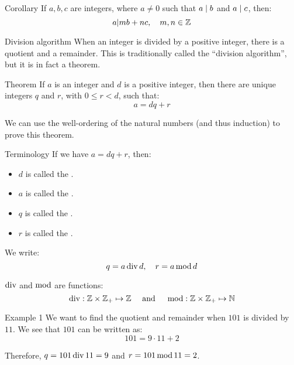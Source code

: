 \documentclass[a4paper]{article}
\begin{document}
\begin{parag}{Corollary}
    If $a,b,c$ are integers, where $a \neq 0$ such that $a \mid b$ and $a \mid c$, then:
    \[a | mb + nc, \quad m,n \in \mathbb{Z}\]
\end{parag}

\begin{parag}{Division algorithm}
    When an integer is divided by a positive integer, there is a quotient and a remainder. This is traditionally called the ``division algorithm'', but it is in fact a theorem.

    \begin{subparag}{Theorem}
        If $a$ is an integer and $d$ is a positive integer, then there are unique integers $q$ and $r$, with $0 \leq r < d$, such that: 
        \[a = dq + r\]

        We can use the well-ordering of the natural numbers (and thus induction) to prove this theorem.
    \end{subparag}

    \begin{subparag}{Terminology}
        If we have $a = dq + r$, then:
        \begin{itemize}
            \item $d$ is called the .
            \item $a$ is called the .
            \item $q$ is called the .
            \item $r$ is called the .
        \end{itemize}

        We write: 
        \[q = a \operatorname{div} d, \quad r = a \operatorname{mod} d\]
        
        $\operatorname{div}$ and $\operatorname{mod}$ are functions:
        \[\operatorname{div} : \mathbb{Z} \times \mathbb{Z}_+ \mapsto \mathbb{Z} \quad \text{ and } \quad \operatorname{mod} : \mathbb{Z} \times \mathbb{Z}_+ \mapsto \mathbb{N}\]
    \end{subparag}
\end{parag}

\begin{parag}{Example 1}
    We want to find the quotient and remainder when $101$ is divided by $11$. We see that $101$ can be written as:
    \[101 = 9\cdot 11 + 2\]
    
    Therefore, $q = 101 \operatorname{div} 11 = 9$ and $r = 101 \operatorname{mod} 11 = 2$.
\end{parag}
\end{document}
